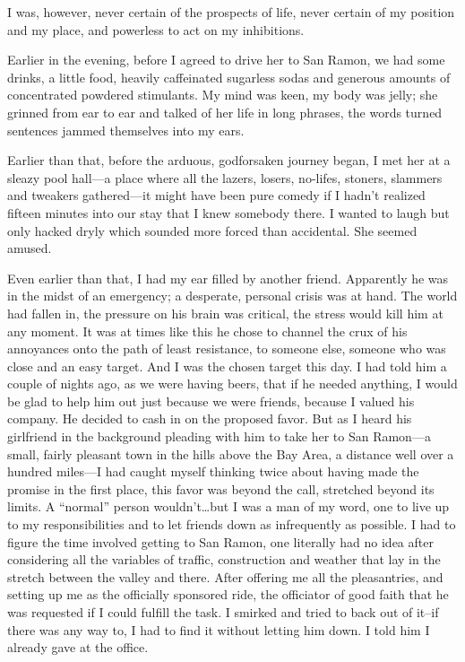 I was, however, never certain of the prospects of life, never certain of
my position and my place, and powerless to act on my inhibitions.

Earlier in the evening, before I agreed to drive her to San Ramon, we
had some drinks, a little food, heavily caffeinated sugarless sodas and
generous amounts of concentrated powdered stimulants. My mind was keen,
my body was jelly; she grinned from ear to ear and talked of her life in
long phrases, the words turned sentences jammed themselves into my ears.

Earlier than that, before the arduous, godforsaken journey began, I met
her at a sleazy pool hall---a place where all the lazers, losers,
no-lifes, stoners, slammers and tweakers gathered---it might have been
pure comedy if I hadn't realized fifteen minutes into our stay that I
knew somebody there. I wanted to laugh but only hacked dryly which
sounded more forced than accidental. She seemed amused.

Even earlier than that, I had my ear filled by another friend.
Apparently he was in the midst of an emergency; a desperate, personal
crisis was at hand. The world had fallen in, the pressure on his brain
was critical, the stress would kill him at any moment. It was at times
like this he chose to channel the crux of his annoyances onto the path
of least resistance, to someone else, someone who was close and an easy
target. And I was the chosen target this day. I had told him a couple of
nights ago, as we were having beers, that if he needed anything, I would
be glad to help him out just because we were friends, because I valued
his company. He decided to cash in on the proposed favor. But as I heard
his girlfriend in the background pleading with him to take her to San
Ramon---a small, fairly pleasant town in the hills above the Bay Area, a
distance well over a hundred miles---I had caught myself thinking twice
about having made the promise in the first place, this favor was beyond
the call, stretched beyond its limits. A ``normal'' person
wouldn't\ldots but I was a man of my word, one to live up to my
responsibilities and to let friends down as infrequently as possible. I
had to figure the time involved getting to San Ramon, one literally had
no idea after considering all the variables of traffic, construction and
weather that lay in the stretch between the valley and there. After
offering me all the pleasantries, and setting up me as the officially
sponsored ride, the officiator of good faith that he was requested if I
could fulfill the task. I smirked and tried to back out of it--if there
was any way to, I had to find it without letting him down. I told him I
already gave at the office.

